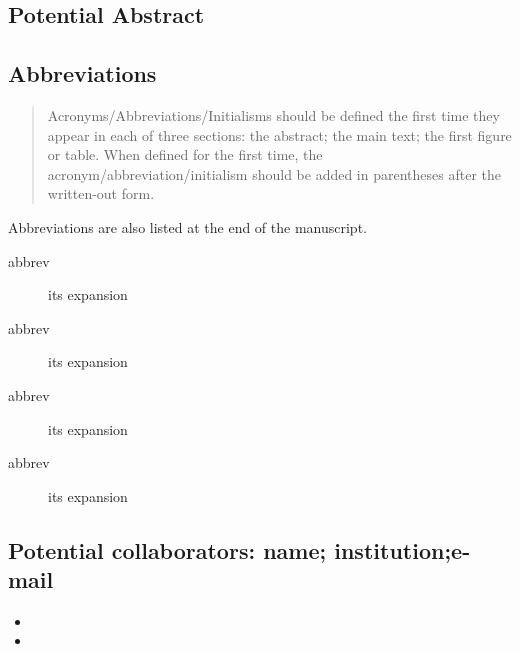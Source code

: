 \documentclass[10pt,letterpaper]{article}
\newcommand{\bi}{\begin{itemize}}
\newcommand{\ei}{\end{itemize}}
\begin{document}
\subsection*{Potential Abstract}




\subsection{Abbreviations}
\label{sub:abbrev}



\begin{quote}
   Acronyms/Abbreviations/Initialisms should be defined the first time they appear in each of three sections: the abstract; the main text; the first figure or table. When defined for the first time, the acronym/abbreviation/initialism should be added in parentheses after the written-out form.
\end{quote}

Abbreviations are also listed at the end of the manuscript.

\begin{description}
    \item[abbrev] its expansion 
    \item[abbrev] its expansion 
    \item[abbrev] its expansion 
    \item[abbrev] its expansion 
\end{description}



\subsection{Potential collaborators: name; institution;e-mail}
\label{sub:collaborators}

\bi
\item 
\item
\ei
\end{document}
